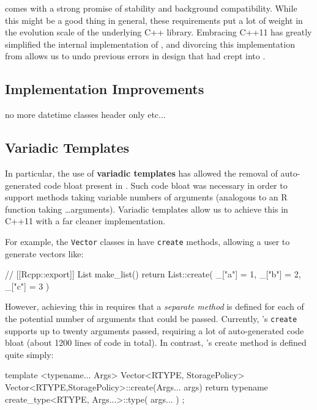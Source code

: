  comes with a strong promise of stability and
background compatibility. While this might be a good thing in general,
these requirements put a lot of weight in the evolution scale of the
underlying C++ library. Embracing C++11 has greatly simplified the internal
implementation of , and divorcing this implementation from
 allows us to undo previous errors in design that had crept into
.

\subsection{Implementation Improvements}

no more datetime classes
header only
etc...

\subsection{Variadic Templates}

In particular, the use of \textbf{variadic templates} has allowed the removal
of auto-generated code bloat present in . Such code bloat was
necessary in order to support methods taking variable numbers of arguments
(analogous to an R function taking \ldots arguments). Variadic templates allow
us to achieve this in C++11 with a far cleaner implementation.

For example, the \texttt{Vector} classes in  have \texttt{create}
methods, allowing a user to generate vectors like:

\begin{example}
// [[Rcpp::export]]
List make_list() {
  return List::create(
    _["a"] = 1,
    _["b"] = 2,
    _["c"] = 3
  )
}
\end{example}

However, achieving this in  requires that a \textit{separate method} is
defined for each of the potential number of arguments that could be passed. Currently,
's \texttt{create} supports up to twenty arguments passed,
requiring a lot of auto-generated code bloat (about 1200 lines of code in total).
In contrast, 's create method is defined quite simply:

\begin{example}
template <typename... Args>
Vector<RTYPE, StoragePolicy> Vector<RTYPE,StoragePolicy>::create(Args... args){
  return typename create_type<RTYPE, Args...>::type( args... ) ;
}
\end{example}

